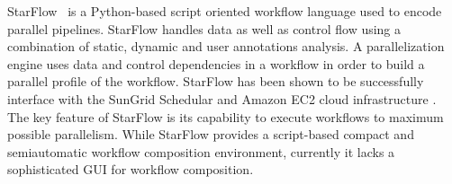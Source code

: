 %
StarFlow~\cite{angelino-yamins-etal:2010} is a Python-based
script oriented workflow language used to encode parallel pipelines. StarFlow
handles data as well as control flow using a combination of static, dynamic and
user annotations analysis. A parallelization engine uses data and control
dependencies in a workflow in order to build a parallel profile of the
workflow. StarFlow has been shown to be successfully interface with the SunGrid
\cite{gentzsch:2001} Schedular and Amazon EC2 cloud infrastructure \cite{ec2}.
The key feature of StarFlow is its capability to execute workflows to maximum
possible parallelism. While StarFlow provides a script-based compact and
semiautomatic workflow composition environment, currently it lacks a
sophisticated GUI for workflow composition. 

